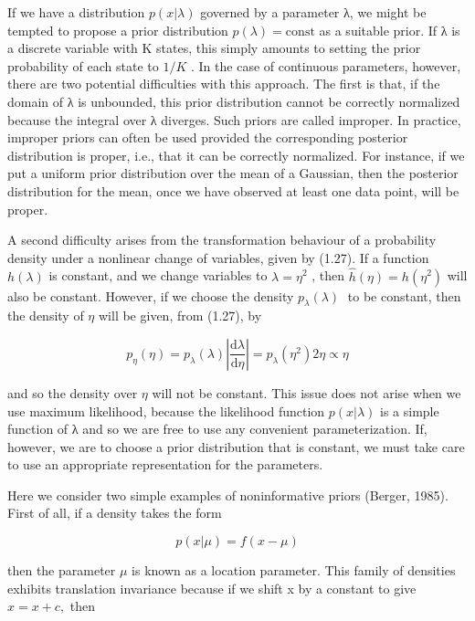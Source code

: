 \documentclass[
  10
]{article}
\begin{document}
If we have a distribution \(p ( x | \lambda )\) governed by a parameter
λ, we might be tempted to propose a prior distribution
\(p ( \lambda ) = \mathrm { c o n s t }\) as a suitable prior. If λ is a
discrete variable with K states, this simply amounts to setting the
prior probability of each state to \(1 / K\) . In the case of continuous
parameters, however, there are two potential difficulties with this
approach. The first is that, if the domain of λ is unbounded, this prior
distribution cannot be correctly normalized because the integral over λ
diverges. Such priors are called improper. In practice, improper priors
can often be used provided the corresponding posterior distribution is
proper, i.e., that it can be correctly normalized. For instance, if we
put a uniform prior distribution over the mean of a Gaussian, then the
posterior distribution for the mean, once we have observed at least one
data point, will be proper.

A second difficulty arises from the transformation behaviour of a
probability density under a nonlinear change of variables, given by
(1.27). If a function \(h ( \lambda )\) is constant, and we change
variables to \(\lambda = \eta ^ { 2 }\) , then
\(\widehat { h } ( \eta ) = h ( \eta ^ { 2 } )\) will also be constant.
However, if we choose the density \(p _ { \lambda } ( \lambda )\) to be
constant, then the density of \(\eta\) will be given, from (1.27), by

\[
p _ {\eta} (\eta) = p _ {\lambda} (\lambda) \left| \frac {\mathrm{d} \lambda}{\mathrm{d} \eta} \right| = p _ {\lambda} (\eta^ {2}) 2 \eta \propto \eta\tag{2.231}
\]

and so the density over \(\eta\) will not be constant. This issue does
not arise when we use maximum likelihood, because the likelihood
function \(p ( x | \lambda )\) is a simple function of λ and so we are
free to use any convenient parameterization. If, however, we are to
choose a prior distribution that is constant, we must take care to use
an appropriate representation for the parameters.

Here we consider two simple examples of noninformative priors (Berger,
1985). First of all, if a density takes the form

\[
p (x | \mu) = f (x - \mu)\tag{2.232}
\]

then the parameter \(\mu\) is known as a location parameter. This family
of densities exhibits translation invariance because if we shift x by a
constant to give \({ \widehat { x } } = x + c ,\) then
\end{document}
